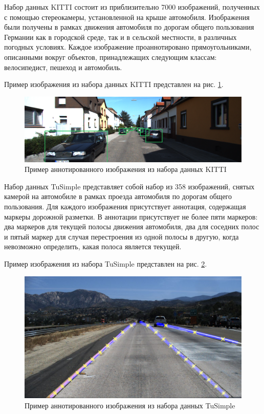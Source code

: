 \documentclass[aps,%
14pt,%
final,%
oneside,
onecolumn,%
musixtex, %
superscriptaddress,%
centertags]{extarticle} %
\begin{document}
Набор данных KITTI состоит из приблизительно 7000 изображений, полученных с помощью стереокамеры, установленной на крыше автомобиля. Изображения были получены в рамках движения автомобиля по дорогам общего пользования Германии как в городской среде, так и в сельской местности, в различных погодных условиях. Каждое изображение проаннотировано прямоугольниками, описанными вокруг объектов, принадлежащих следующим классам: велосипедист, пешеход и автомобиль.

Пример изображения из набора данных KITTI представлен на рис. \ref{fig:ex_kitti}.

\begin{figure}[htp]
\centering
\includegraphics[width=\textwidth]{kitti_ex.png}
\caption{Пример аннотированного изображения из набора данных KITTI}
\label{fig:ex_kitti}
\end{figure}

Набор данных TuSimple представляет собой набор из 358 изображений, снятых камерой на автомобиле в рамках проезда автомобиля по дорогам общего пользования. Для каждого изображения присутствует аннотация, содержащая маркеры дорожной разметки. В аннотации присутствует не более пяти маркеров: два маркеров для текущей полосы движения автомобиля, два для соседних полос и пятый маркер для случая перестроения из одной полосы в другую, когда невозможно определить, какая полоса является текущей.

Пример изображения из набора TuSimple  представлен на рис. \ref{fig:ex_tusimple}.

\begin{figure}[htp]
\centering
\includegraphics[width=\textwidth]{ex_tusimple.png}
\caption{Пример аннотированного изображения из набора данных TuSimple}
\label{fig:ex_tusimple}
\end{figure}
\end{document}
